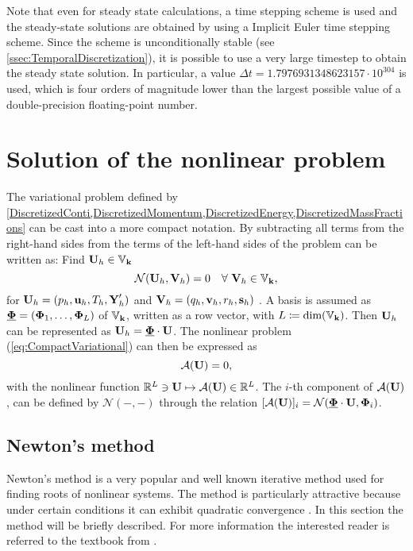 Note that even for steady state calculations, a time stepping scheme is used and the steady-state solutions are obtained by using a Implicit Euler time stepping scheme. Since the scheme is unconditionally stable (see \cref{ssec:TemporalDiscretization}), it is possible to use a very large timestep to obtain the steady state solution. In particular, a value $\Delta t = 1.7976931348623157\cdot 10^{304}$ is used, which is four orders of magnitude lower than the largest possible value of a double-precision floating-point number.
\section{Solution of the nonlinear problem}\label{sec:SolNonLinProblem}



The variational problem defined by \cref*{DiscretizedConti,DiscretizedMomentum,DiscretizedEnergy,DiscretizedMassFractions} can be cast into a more compact notation. By subtracting all terms from the right-hand sides from the terms of the left-hand sides of  the problem can be written as:
Find $\textbf{U}_h \in \mathbb{V}_{\textbf{k}}$
\begin{equation}
	\mathcal{N}(\textbf{U}_h,\textbf{V}_h) = 0 \quad \forall \ \textbf{V}_h \in \mathbb{V}_{\textbf{k}} ,
	\label{eq:CompactVariational}
\end{equation}
for
$\textbf{U}_h = (p_h,\textbf{u}_h, T_h, \textbf{Y}'_h)$ and
$\textbf{V}_h = (q_h,\textbf{v}_h, r_h, \mathbf{s}_h)$
. A basis is assumed as
$\underline{\boldsymbol{\Phi}} = ( \boldsymbol{\Phi}_1, \ldots , \boldsymbol{\Phi}_L )$ of $\mathbb{V}_{\textbf{k}}$,
written as a row vector, with $L \coloneqq \textrm{dim}(\mathbb{V}_{\textbf{k}})$.
Then $\textbf{U}_h$ can be represented as
$ \textbf{U}_h =  \underline{ \boldsymbol{\Phi} } \cdot \textbf{U} $.
The nonlinear problem (\ref{eq:CompactVariational}) can then be expressed as
\begin{equation}
	\mathcal{A}(\textbf{U}) = 0 ,
	\label{Eq:nonLinSystem}
\end{equation}
with the nonlinear function
$\mathbb{R}^L \ni \textbf{U} \mapsto \mathcal{A}(\textbf{U}) \in \mathbb{R}^L$.
The $i$-th component of $ \mathcal{A}(\textbf{U})$, can be defined by $\mathcal{N}(-,-)$ through the relation
$[\mathcal{A}(\textbf{U})]_i = \mathcal{N}( \underline{ \boldsymbol{\Phi} } \cdot \textbf{U} , \boldsymbol{\Phi}_i)$.

\subsection{Newton's method}
Newton's method is a very popular and well known iterative method used for finding roots of nonlinear systems. The method is particularly attractive because under certain conditions it can exhibit quadratic convergence \parencite{deuflhardNewtonMethodsNonlinear2011}. In this section the method will be briefly described. For more information the interested reader is referred to the textbook from \textcite{kelleyIterativeMethodsLinear1995}. 

